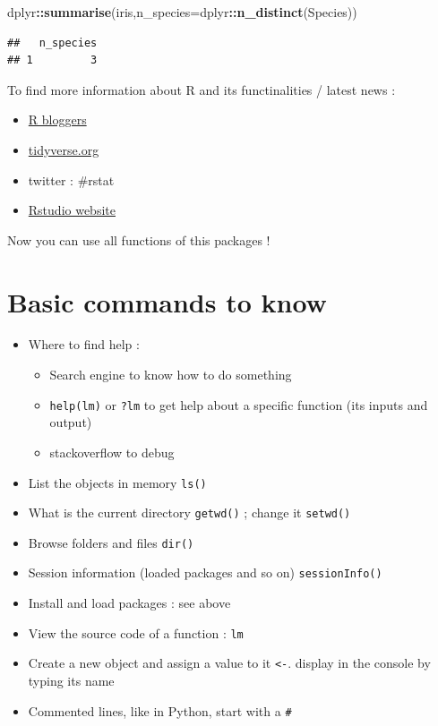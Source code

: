 \documentclass[
]{book}
\newenvironment{Shaded}{\begin{snugshade}}{\end{snugshade}}
\newcommand{\DataTypeTok}[1]{\textcolor[rgb]{0.13,0.29,0.53}{#1}}
\newcommand{\KeywordTok}[1]{\textcolor[rgb]{0.13,0.29,0.53}{\textbf{#1}}}
\newcommand{\NormalTok}[1]{#1}
\newcommand{\OperatorTok}[1]{\textcolor[rgb]{0.81,0.36,0.00}{\textbf{#1}}}
\providecommand{\tightlist}{%
  \setlength{\itemsep}{0pt}\setlength{\parskip}{0pt}}
\begin{document}
\begin{Shaded}
\begin{Highlighting}[]
\NormalTok{dplyr}\OperatorTok{::}\KeywordTok{summarise}\NormalTok{(iris,}\DataTypeTok{n_species=}\NormalTok{dplyr}\OperatorTok{::}\KeywordTok{n_distinct}\NormalTok{(Species))}
\end{Highlighting}
\end{Shaded}

\begin{verbatim}
##   n_species
## 1         3
\end{verbatim}

To find more information about R and its functinalities / latest news :

\begin{itemize}
\tightlist
\item
  \href{https://www.r-bloggers.com/}{R bloggers}
\item
  \url{tidyverse.org}
\item
  twitter : \#rstat
\item
  \href{https://rstudio.com/}{Rstudio website}
\end{itemize}

Now you can use all functions of this packages !

\hypertarget{basic-commands-to-know}{%
\section{Basic commands to know}\label{basic-commands-to-know}}

\begin{itemize}
\tightlist
\item
  Where to find help :

  \begin{itemize}
  \tightlist
  \item
    Search engine to know how to do something
  \item
    \texttt{help(lm)} or \texttt{?lm} to get help about a specific function (its inputs and output)
  \item
    stackoverflow to debug
  \end{itemize}
\item
  List the objects in memory \texttt{ls()}
\item
  What is the current directory \texttt{getwd()} ; change it \texttt{setwd()}
\item
  Browse folders and files \texttt{dir()}
\item
  Session information (loaded packages and so on) \texttt{sessionInfo()}
\item
  Install and load packages : see above
\item
  View the source code of a function : \texttt{lm}
\item
  Create a new object and assign a value to it \texttt{\textless{}-}. display in the console by typing its name
\item
  Commented lines, like in Python, start with a \texttt{\#}
\end{itemize}
\end{document}
